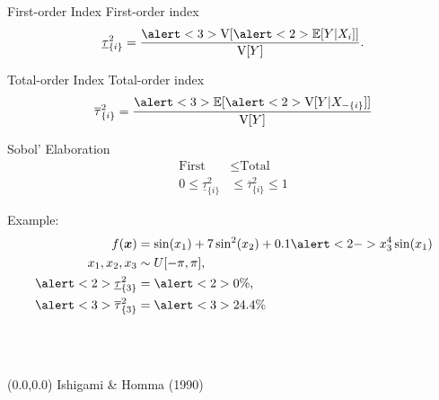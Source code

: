 \documentclass[14pt]{beamer}
\begin{document}
\begin{frame}{First-order Index}
   First-order index
  \begin{equation*}
    \underline{\tau}_{\{i\}}^2 = \frac{\alert<3>{\V[\alert<2>{\E[Y|X_i]}]}}{\V[Y]}.
  \end{equation*}

\end{frame}

\begin{frame}{Total-order Index}
  Total-order index
  \begin{equation*}
    \overline{\tau}_{\{i\}}^2 = \frac{\alert<3>{\E[\alert<2>{\V[Y|X_{-\{i\}}]}]}}{\V[Y]}
  \end{equation*}

\end{frame}

\begin{frame}{Sobol' Elaboration}
  \begin{equation*} \begin{aligned}
      \text{First} &\leq \text{Total} \\
      0 \leq \underline{\tau}_{\{i\}}^2 &\leq \overline{\tau}_{\{i\}}^2 \leq 1
  \end{aligned} \end{equation*}

  Example:
  \begin{equation*} \begin{aligned}
    f(\vx) &= \sin(x_1) + 7\sin^2(x_2) + 0.1 \alert<2->{x_3^4\sin(x_1)} \\
    x_1, x_2, x_3 &\sim U[-\pi, \pi], \\
    \alert<2>{\underline{\tau}_{\{3\}}^2} &= \alert<2>{0\%}, \\
    \alert<3>{\overline{\tau}_{\{3\}}^2} &= \alert<3>{24.4\%}
  \end{aligned} \end{equation*}

  \\
  \\
 \begin{textblock}{5}(0.0,0.0)
    {\tiny Ishigami \& Homma (1990)}
 \end{textblock}
\end{frame}
\end{document}
